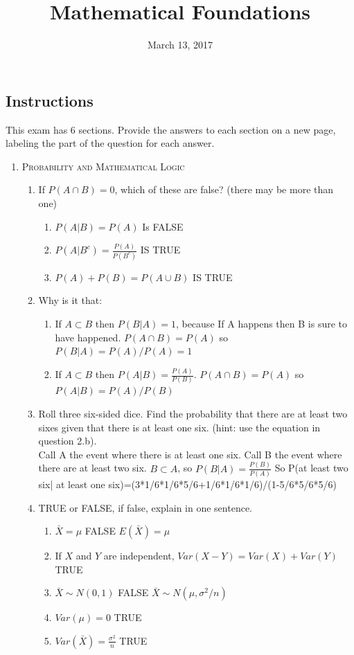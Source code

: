 \documentclass[11pt,letterpaper]{article}
\title{Mathematical Foundations}
\date{March 13, 2017}
\numberwithin{equation}{section}
\begin{document}
\maketitle
\subsection*{Instructions}
This exam has 6 sections.  Provide the answers to each section on a new page, labeling the part of the question for each answer.  
\begin{enumerate}[I]
\item \textsc{Probability and Mathematical Logic }
\begin{enumerate}[1)]
\item If $P(A\cap B)=0$, which of these are false? (there may be more than one)
\begin{enumerate}
\item[a)] $P(A|B)=P(A)$ Is FALSE
\item[b)] $P(A|B^c)=\frac{P(A)}{P(B^c)}$ IS TRUE
\item[c)] $P(A)+P(B)=P(A\cup B)$ IS TRUE
\end{enumerate}
\item  Why is it that: 
\begin{enumerate}
\item[a)] If $A \subset B$ then $P(B|A) = 1$, because If A happens then B is sure to have happened.  $P(A\cap B)= P(A)$ so $P(B|A)=P(A)/P(A)=1 $
\item[b)] If $A \subset B$ then $P(A|B) = \frac{P(A)}{P(B)}$.  $P(A\cap B)= P(A)$ so $P(A|B)=P(A)/P(B) $
\end{enumerate}
\item Roll three six-sided dice. Find the probability that there are at least two sixes given that there is at least one six. (hint: use the equation in question 2.b).  \\

Call A the event where there is at least one six.  Call B the event where there are at least two six.  $B \subset A$, so $P(B|A)=\frac{P(B)}{P(A)}$  So P(at least two six| at least one six)=(3*1/6*1/6*5/6+1/6*1/6*1/6)/(1-5/6*5/6*5/6)

\item TRUE or FALSE, if false, explain in one sentence.
\begin{enumerate}
\item[a)] $\bar{X}=\mu$  FALSE $E(\bar{X})=\mu$
\item[b)] If $X$ and $Y$ are independent, $Var(X-Y)=Var(X)+Var(Y)$  TRUE
\item[c)] $\bar{X}\sim N(0,1)$ FALSE $\bar{X}\sim N(\mu, \sigma^2/n)$
\item[d)] $Var(\mu)=0$ TRUE
\item[e)] $Var(\bar{X})=\frac{\sigma^2}{n}$ TRUE
\end{enumerate}


\end{enumerate}
\end{enumerate}
\end{document}
